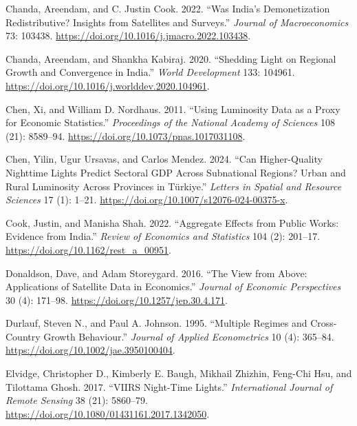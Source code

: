 \documentclass[
  letterpaper,
  DIV=11,
  numbers=noendperiod]{scrartcl}
\newlength{\cslhangindent}
\newenvironment{CSLReferences}[2] %
 {\begin{list}{}{%
  \setlength{\itemindent}{0pt}
  \setlength{\leftmargin}{0pt}
  \setlength{\parsep}{0pt}
  \ifodd #1
   \setlength{\leftmargin}{\cslhangindent}
   \setlength{\itemindent}{-1\cslhangindent}
  \fi
  \setlength{\itemsep}{#2\baselineskip}}}
 {\end{list}}
\begin{document}
\begin{CSLReferences}{1}{0}
Chanda, Areendam, and C. Justin Cook. 2022. {``Was {India's}
Demonetization Redistributive? {Insights} from Satellites and
Surveys.''} \emph{Journal of Macroeconomics} 73: 103438.
\url{https://doi.org/10.1016/j.jmacro.2022.103438}.

Chanda, Areendam, and Shankha Kabiraj. 2020. {``Shedding Light on
Regional Growth and Convergence in India.''} \emph{World Development}
133: 104961. \url{https://doi.org/10.1016/j.worlddev.2020.104961}.

Chen, Xi, and William D. Nordhaus. 2011. {``Using Luminosity Data as a
Proxy for Economic Statistics.''} \emph{Proceedings of the National
Academy of Sciences} 108 (21): 8589--94.
\url{https://doi.org/10.1073/pnas.1017031108}.

Chen, Yilin, Ugur Ursavas, and Carlos Mendez. 2024. {``Can
Higher-Quality Nighttime Lights Predict Sectoral {GDP} Across
Subnational Regions? {Urban} and Rural Luminosity Across Provinces in
{Türkiye}.''} \emph{Letters in Spatial and Resource Sciences} 17 (1):
1--21. \url{https://doi.org/10.1007/s12076-024-00375-x}.

Cook, Justin, and Manisha Shah. 2022. {``Aggregate Effects from Public
Works: Evidence from India.''} \emph{Review of Economics and Statistics}
104 (2): 201--17. \url{https://doi.org/10.1162/rest_a_00951}.

Donaldson, Dave, and Adam Storeygard. 2016. {``The View from Above:
Applications of Satellite Data in Economics.''} \emph{Journal of
Economic Perspectives} 30 (4): 171--98.
\url{https://doi.org/10.1257/jep.30.4.171}.

Durlauf, Steven N., and Paul A. Johnson. 1995. {``Multiple Regimes and
Cross-Country Growth Behaviour.''} \emph{Journal of Applied
Econometrics} 10 (4): 365--84.
\url{https://doi.org/10.1002/jae.3950100404}.

Elvidge, Christopher D., Kimberly E. Baugh, Mikhail Zhizhin, Feng-Chi
Hsu, and Tilottama Ghosh. 2017. {``VIIRS Night-Time Lights.''}
\emph{International Journal of Remote Sensing} 38 (21): 5860--79.
\url{https://doi.org/10.1080/01431161.2017.1342050}.


\end{CSLReferences}
\end{document}
